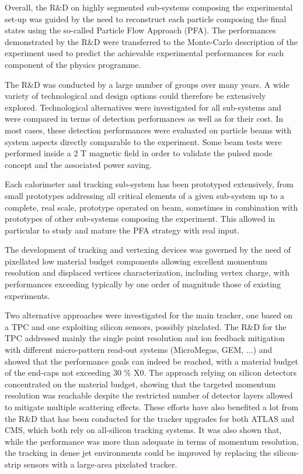 \documentclass[%
 reprint,
 amsmath,amssymb,
 aps,
]{revtex4-1}
\begin{document}
Overall, the R\&D on highly segmented sub-systems composing the experimental set-up was guided by the need to reconstruct each particle composing the ﬁnal states using the so-called Particle Flow Approach (PFA). The performances demonstrated by the R\&D were transferred to the Monte-Carlo description of the experiment used to predict the achievable experimental performances for each component of the physics programme.

The R\&D was conducted by a large number of groups over many years. A wide variety of technological and design options could therefore be extensively explored. Technological alternatives were investigated for all sub-systems and were compared in terms of detection performances as well as for their cost. In most cases, these detection performances were evaluated on particle beams with system aspects directly comparable to the experiment. Some beam tests were performed inside a 2 T magnetic ﬁeld in order to validate the pulsed mode concept and the associated power saving.

Each calorimeter and tracking sub-system has been prototyped extensively, from small prototypes addressing all critical elements of a given sub-system up to a complete, real scale, prototype operated on beam, sometimes in combination with prototypes of other sub-systems composing the experiment. This allowed in particular to study and mature the PFA strategy with real input.

The development of tracking and vertexing devices was governed by the need of pixellated low material budget components allowing excellent momentum resolution and displaced vertices characterization, including vertex charge, with performances exceeding typically by one order of magnitude those of existing experiments.

Two alternative approaches were investigated for the main tracker, one based on a TPC and one exploiting silicon sensors, possibly pixelated. The R\&D for the TPC addressed mainly the single point resolution and ion feedback mitigation with diﬀerent micro-pattern read-out systems (MicroMegas, GEM, ...) and showed that the performance goals can indeed be reached, with a material budget of the end-caps not exceeding 30 \% X0. The approach relying on silicon detectors concentrated on the material budget, showing that the targeted momentum resolution was reachable despite the restricted number of detector layers allowed to mitigate multiple scattering eﬀects. These efforts have also benefited a lot from the R\&D that has been conducted for the tracker upgrades for both ATLAS and CMS, which both rely on all-silicon tracking systems.
It was also shown that, while the performance was more than adequate in terms of momentum resolution, the tracking in dense jet environments could be improved by replacing the silicon-strip sensors with a large-area pixelated tracker. 
\end{document}
